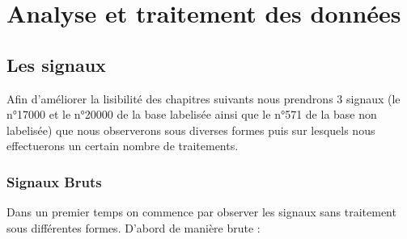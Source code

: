 
\hypertarget{Analyse-et-traitement-des-donnuxe9es}{%
\chapter{Analyse et traitement des données}\label{Analyse-et-traitement-des-donnuxe9es}}

\hypertarget{Les-signaux}{%
\section{Les signaux}
\label{Les-signaux}}

Afin d'améliorer la lisibilité des chapitres suivants nous prendrons 3 signaux (le n°17000 et le n°20000 de la base labelisée ainsi que le n°571 de la base non labelisée) que nous observerons sous diverses formes puis sur lesquels nous effectuerons un certain nombre de traitements.

\hypertarget{Signaux-Bruts}{%
\subsection{Signaux Bruts}
\label{Signaux-Bruts}}

Dans un premier temps on commence par observer les signaux sans traitement sous différentes formes.\n
D'abord de manière brute :

